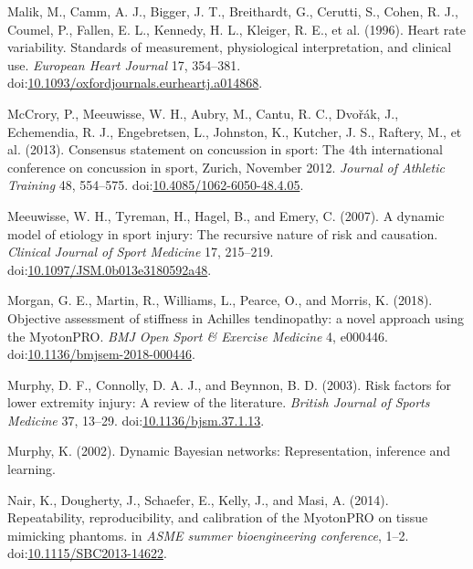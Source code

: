 \documentclass[
  english,
  man]{apa6}
\newlength{\cslhangindent}
\newenvironment{cslreferences}%
  {\setlength{\parindent}{0pt}%
  \everypar{\setlength{\hangindent}{\cslhangindent}}\ignorespaces}%
  {\par}
\begin{document}
\begin{cslreferences}
\leavevmode\hypertarget{ref-Malik1996}{}%
Malik, M., Camm, A. J., Bigger, J. T., Breithardt, G., Cerutti, S., Cohen, R. J., Coumel, P., Fallen, E. L., Kennedy, H. L., Kleiger, R. E., et al. (1996). Heart rate variability. Standards of measurement, physiological interpretation, and clinical use. \emph{European Heart Journal} 17, 354--381. doi:\href{https://doi.org/10.1093/oxfordjournals.eurheartj.a014868}{10.1093/oxfordjournals.eurheartj.a014868}.

\leavevmode\hypertarget{ref-McCrory2013}{}%
McCrory, P., Meeuwisse, W. H., Aubry, M., Cantu, R. C., Dvořák, J., Echemendia, R. J., Engebretsen, L., Johnston, K., Kutcher, J. S., Raftery, M., et al. (2013). Consensus statement on concussion in sport: The 4th international conference on concussion in sport, Zurich, November 2012. \emph{Journal of Athletic Training} 48, 554--575. doi:\href{https://doi.org/10.4085/1062-6050-48.4.05}{10.4085/1062-6050-48.4.05}.

\leavevmode\hypertarget{ref-Meeuwisse2007}{}%
Meeuwisse, W. H., Tyreman, H., Hagel, B., and Emery, C. (2007). A dynamic model of etiology in sport injury: The recursive nature of risk and causation. \emph{Clinical Journal of Sport Medicine} 17, 215--219. doi:\href{https://doi.org/10.1097/JSM.0b013e3180592a48}{10.1097/JSM.0b013e3180592a48}.

\leavevmode\hypertarget{ref-Morgan2018}{}%
Morgan, G. E., Martin, R., Williams, L., Pearce, O., and Morris, K. (2018). Objective assessment of stiffness in Achilles tendinopathy: a novel approach using the MyotonPRO. \emph{BMJ Open Sport \& Exercise Medicine} 4, e000446. doi:\href{https://doi.org/10.1136/bmjsem-2018-000446}{10.1136/bmjsem-2018-000446}.

\leavevmode\hypertarget{ref-Murphy2003}{}%
Murphy, D. F., Connolly, D. A. J., and Beynnon, B. D. (2003). Risk factors for lower extremity injury: A review of the literature. \emph{British Journal of Sports Medicine} 37, 13--29. doi:\href{https://doi.org/10.1136/bjsm.37.1.13}{10.1136/bjsm.37.1.13}.

\leavevmode\hypertarget{ref-Murphy2002}{}%
Murphy, K. (2002). Dynamic Bayesian networks: Representation, inference and learning.

\leavevmode\hypertarget{ref-Nair2014}{}%
Nair, K., Dougherty, J., Schaefer, E., Kelly, J., and Masi, A. (2014). Repeatability, reproducibility, and calibration of the MyotonPRO on tissue mimicking phantoms. in \emph{ASME summer bioengineering conference}, 1--2. doi:\href{https://doi.org/10.1115/SBC2013-14622}{10.1115/SBC2013-14622}.


\end{cslreferences}
\end{document}
